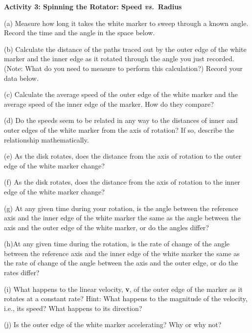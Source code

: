 \textbf{Activity 3: Spinning the Rotator: Speed \textit{vs.}~Radius} 

(a) Measure how long it takes the white marker to sweep through a known angle.
Record the time and the angle in the space below.
\answerspace{10mm}

(b) Calculate the distance of the paths traced out by the outer edge of the white marker and the inner edge as it rotated through the angle you just recorded.
(Note: What do you need to measure to perform this calculation?) Record your
data below.
\answerspace{20mm}

(c) Calculate the average speed of the outer edge of the white marker and the
average speed of the inner edge of the marker. How do they compare?
\answerspace{20mm}

(d) Do the speeds seem to be related in any way to the distances of inner and
outer edges of the white marker from the axis of rotation? If so, describe the
relationship mathematically.
\answerspace{18mm}

\pagebreak[2]
(e) As the disk rotates, does the distance from the axis of rotation to the outer edge of the white marker change?
\answerspace{10mm}

(f) As the disk rotates, does the distance from the axis of rotation to the inner edge of the white marker change?
\vspace{10mm}

(g) At any given time during your rotation, is the angle between the reference
axis and the inner edge of the white marker the same as the angle between the
axis and the outer edge of the white marker, or do the angles differ?
\vspace{10mm}

(h)At any given time during the rotation, is the rate of change of the angle
between the reference axis and the inner edge of the white marker the same as
the rate of change of the angle between the axis and the outer edge, or do the
rates differ?
\vspace{10mm}

(i) What happens to the linear velocity, \textbf{v}, of the outer edge of the
marker as it rotates at a constant rate? Hint: What happens to the magnitude
of the velocity, i.e., its speed? What happens to its direction?
\vspace{20mm}

(j) Is the outer edge of the white marker accelerating? Why or why not?
\vspace{20mm}

